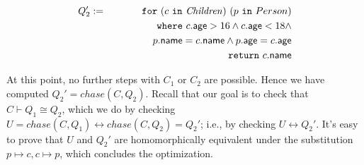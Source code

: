 \documentclass{sigplanconf}
\newcommand{\FOR}{{\tt for}\relax\ifmmode\ \else\xspace\fi}
\newcommand{\WHERE}{{\tt where}\relax\ifmmode\ \else\xspace\fi}
\newcommand{\IN}{ \ {\tt in} \ }
\newcommand{\RETURN}{{\tt return}\relax\ifmmode\ \else\xspace\fi}
\newcommand{\relation}[1]{\ensuremath{\mathit{#1}}\xspace}
\begin{document}
\begin{eqnarray*}
Q_2' & := & \FOR (c \IN \relation{Children}) \ (p \IN Person) \\
 & & \WHERE c.{\sf age} > 16 \wedge c.{\sf age} < 18 \wedge \\
 & & \ \ \ \ \ \ \ \ \ \ \ \   p.{\sf name} = c.{\sf name} \wedge p.{\sf age} = c.{\sf age}\\
  & & \RETURN c.{\sf name}
\end{eqnarray*}  

At this point, no further steps with $C_1$ or $C_2$ are possible.
Hence we have computed $Q_2' = chase(C, Q_2)$.
Recall that our goal is to check that $C \vdash Q_1 \cong Q_2$, which we do by checking $U = chase(C, Q_1) \leftrightarrow chase(C, Q_2) = Q_2'$; i.e., by checking $U \leftrightarrow Q_2'$.
It's easy to prove that $U$ and $Q_2'$ are homomorphically equivalent under the substitution $p \mapsto c, c \mapsto p$, which concludes the optimization.

%
%
\end{document}

